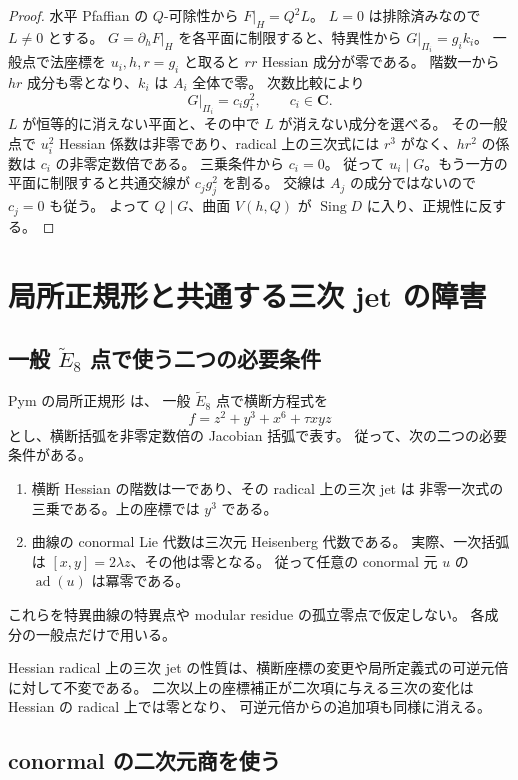 \documentclass[11pt,a4paper]{ltjsarticle}
\newcommand{\CC}{\mathbf C}\newcommand{\QQ}{\mathbf Q}
\theoremstyle{remark}\newtheorem{remark}[theorem]{注意}
\begin{document}
\begin{proof}
水平 Pfaffian の $Q$-可除性から $F|_H=Q^2L$。
$L=0$ は排除済みなので $L\ne0$ とする。
$G=\partial_hF|_H$ を各平面に制限すると、特異性から $G|_{\Pi_i}=g_i k_i$。
一般点で法座標を $u_i,h,r=g_i$ と取ると $rr$ Hessian 成分が零である。
階数一から $hr$ 成分も零となり、$k_i$ は $A_i$ 全体で零。
次数比較により
\[
G|_{\Pi_i}=c_i g_i^2,\qquad c_i\in\CC.
\]
$L$ が恒等的に消えない平面と、その中で $L$ が消えない成分を選べる。
その一般点で $u_i^2$ Hessian 係数は非零であり、radical 上の三次式には
$r^3$ がなく、$hr^2$ の係数は $c_i$ の非零定数倍である。
三乗条件から $c_i=0$。
従って $u_i\mid G$。もう一方の平面に制限すると共通交線が $c_j g_j^2$ を割る。
交線は $A_j$ の成分ではないので $c_j=0$ も従う。
よって $Q\mid G$、曲面 $V(h,Q)$ が $\operatorname{Sing}D$ に入り、正規性に反する。
\end{proof}



\section{局所正規形と共通する三次 jet の障害}\label{sec:local}

\subsection{一般 \texorpdfstring{$\widetilde E_8$}{E8} 点で使う二つの必要条件}

Pym の局所正規形 \cite[Theorem 4.5, Table 1]{PymElliptic}は、
一般 $\widetilde E_8$ 点で横断方程式を
\[
f=z^2+y^3+x^6+\tau xyz
\]
とし、横断括弧を非零定数倍の Jacobian 括弧で表す。
従って、次の二つの必要条件がある。
\begin{enumerate}
\item 横断 Hessian の階数は一であり、その radical 上の三次 jet は
非零一次式の三乗である。上の座標では $y^3$ である。
\item 曲線の conormal Lie 代数は三次元 Heisenberg 代数である。
実際、一次括弧は $[x,y]=2\lambda z$、その他は零となる。
従って任意の conormal 元 $u$ の $\operatorname{ad}(u)$ は冪零である。
\end{enumerate}
これらを特異曲線の特異点や modular residue の孤立零点で仮定しない。
各成分の一般点だけで用いる。

Hessian radical 上の三次 jet の性質は、横断座標の変更や局所定義式の可逆元倍に対して不変である。
二次以上の座標補正が二次項に与える三次の変化は Hessian の radical 上では零となり、
可逆元倍からの追加項も同様に消える。

\subsection{conormal の二次元商を使う}
\end{document}
